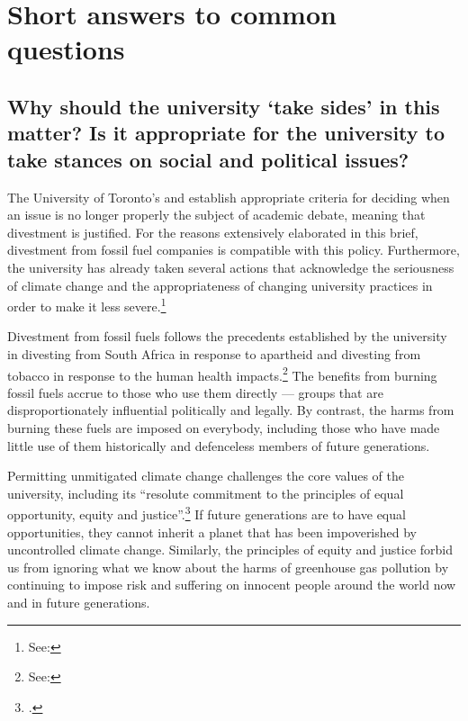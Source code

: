 


		\singlespacing
		\section{Short answers to common questions}
		\label{sec:FAQ}
		\doublespacing
		






	\subsection{Why should the university `take sides' in this matter? Is it appropriate for the university to take stances on social and political issues?}
	\label{TakeSides}



The University of Toronto's  and  establish appropriate criteria for deciding when an issue is no longer properly the subject of academic debate, meaning that divestment is justified.
For the reasons extensively elaborated in this brief, divestment from fossil fuel companies is compatible with this policy.
Furthermore, the university has already taken several actions that acknowledge the seriousness of climate change and the appropriateness of changing university practices in order to make it less severe.\footnote{See: }



Divestment from fossil fuels follows the precedents established by the university in divesting from South Africa in response to apartheid and divesting from tobacco in response to the human health impacts.\footnote{See: }
The benefits from burning fossil fuels accrue to those who use them directly --- groups that are disproportionately influential politically and legally.
By contrast, the harms from burning these fuels are imposed on everybody, including those who have made little use of them historically and defenceless members of future generations.






Permitting unmitigated climate change challenges the core values of the university, including its ``resolute commitment to the principles of equal opportunity, equity and justice''.\footcite{InstitutionalPurpose}
If future generations are to have equal opportunities, they cannot inherit a planet that has been impoverished by uncontrolled climate change.
Similarly, the principles of equity and justice forbid us from ignoring what we know about the harms of greenhouse gas pollution by continuing to impose risk and suffering on innocent people around the world now and in future generations.



